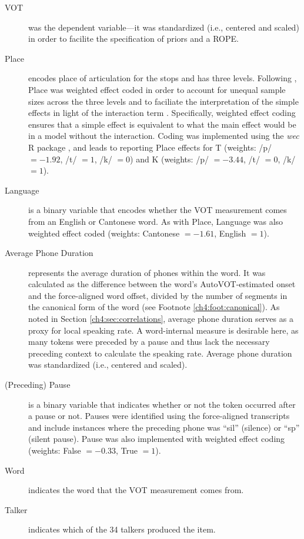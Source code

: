 \begin{description}
  \item[VOT] was the dependent variable---it was standardized (i.e., centered and scaled) in order to facilite the specification of priors and a ROPE. 
  \item[Place] encodes place of articulation for the stops and has three levels. Following \citet{chodroff_2017_structure}, Place was weighted effect coded in order to account for unequal sample sizes across the three levels and to faciliate the interpretation of the simple effects in light of the interaction term \citep{brehm_2021_contrasts}. Specifically, weighted effect coding ensures that a simple effect is equivalent to what the main effect would be in a model without the interaction. Coding was implemented using the \textit{wec} R package \citep{nieuwenhuis_2017_weighted}, and leads to reporting Place effects for T (weights: /p/ $=-1.92$, /t/ $=1$, /k/ $=0$) and K (weights: /p/ $=-3.44$, /t/ $=0$, /k/ $=1$).  
  \item[Language] is a binary variable that encodes whether the VOT measurement comes from an English or Cantonese word. As with Place, Language was also weighted effect coded (weights: Cantonese $=-1.61$, English $=1$).
  \item[Average Phone Duration] represents the average duration of phones within the word. It was calculated as the difference between the word's AutoVOT-estimated onset and the force-aligned word offset, divided by the number of segments in the canonical form of the word (see Footnote \ref{ch4:foot:canonical}). As noted in Section \ref{ch4:sec:correlations}, average phone duration serves as a proxy for local speaking rate. A word-internal measure is desirable here, as many tokens were preceded by a pause and thus lack the necessary preceding context to calculate the speaking rate. Average phone duration was standardized (i.e., centered and scaled). 
  \item[(Preceding) Pause] is a binary variable that indicates whether or not the token occurred after a pause or not. Pauses were identified using the force-aligned transcripts and include instances where the preceding phone was ``sil'' (silence) or ``sp'' (silent pause). Pause was also implemented with weighted effect coding (weights: False $=-0.33$, True $=1$).
  \item[Word] indicates the word that the VOT measurement comes from. 
  \item[Talker] indicates which of the 34 talkers produced the item.
\end{description}

